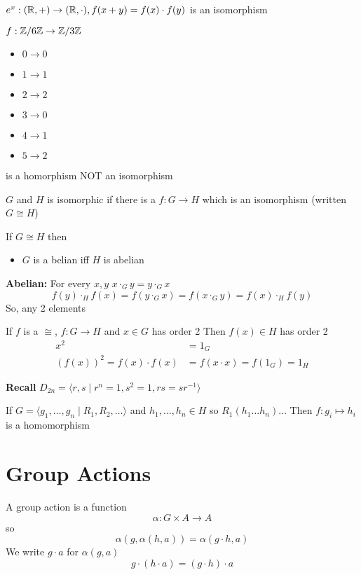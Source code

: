 \begin{example}
  $e^x: (\mathbb R, +) \to (\mathbb R, \cdot), f(x+y)=f(x)\cdot f(y)$
  is an isomorphism
\end{example}

\begin{example}
  $f : \mathbb Z/6\mathbb Z \to \mathbb Z/3\mathbb Z$
  \begin{itemize}
    \item $0 \to 0$
    \item $1 \to 1$
    \item $2 \to 2$
    \item $3 \to 0$
    \item $4 \to 1$
    \item $5 \to 2$
  \end{itemize}
  is a homorphism NOT an isomorphism
\end{example}

\begin{definition}
  $G$ and $H$ is isomorphic if there is a $f: G \to H$ which is an isomorphism 
  (written $G\cong H$)
\end{definition}

If $G\cong H$ then 
\begin{itemize}
  \item $G$ is a belian iff $H$ is abelian
\end{itemize}

\textbf{Abelian:} For every $x, y$ $x\cdot_G y = y\cdot_G x$
\[f(y)\cdot_H f(x) = f(y\cdot_G x) = f(x\cdot_G y) = f(x)\cdot_Hf(y)\]
So, any 2 elements

If $f$ is a $\cong$, $f: G \to H$ and $x \in G$ has order 2
Then $f(x) \in H$ has order 2
\begin{align*}
  x^2 &= 1_G \\
  (f(x))^2 = f(x)\cdot f(x) &= f(x\cdot x) = f(1_G) = 1_H
\end{align*}

\textbf{Recall} $D_{2n} = \langle r, s \mid r^n = 1, s^2 = 1, rs=sr^{-1}\rangle$

If $G = \langle g_1, \dotsc, g_n \mid R_1, R_2, \dotsc \rangle$ and 
$h_1, \dotsc, h_n \in H$ so $R_1(h_1\dotsc h_n)\dotsc$ 
Then $f: g_i \mapsto h_i$ is a homomorphism 

\section{Group Actions}
\begin{definition}
  A group action is a function
  \[\alpha: G \times A \to A\]
  so \[\alpha(g, \alpha(h, a)) = \alpha(g\cdot h, a)\]
  We write $g \cdot a$ for $\alpha(g, a)$
  \[g\cdot(h\cdot a) = (g\cdot h)\cdot a\]
\end{definition}

